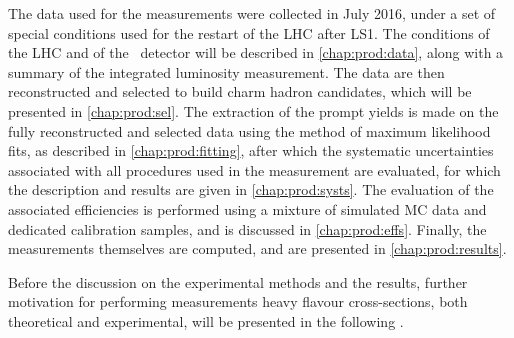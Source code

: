 The data used for the measurements were collected in July 2016, under a set of 
special conditions used for the restart of the \ac{LHC} after \ac{LS1}.
The conditions of the \ac{LHC} and of the \lhcb\ detector will be described in 
\cref{chap:prod:data}, along with a summary of the integrated luminosity 
measurement.
The data are then reconstructed and selected to build charm hadron candidates, 
which will be presented in \cref{chap:prod:sel}.
The extraction of the prompt yields is made on the fully reconstructed and 
selected data using the method of maximum likelihood fits, as described in 
\cref{chap:prod:fitting}, after which the systematic uncertainties associated 
with all procedures used in the measurement are evaluated, for which the 
description and results are given in \cref{chap:prod:systs}.
The evaluation of the associated efficiencies is performed using a mixture of 
simulated \acl{MC} data and dedicated calibration samples, and is discussed in 
\cref{chap:prod:effs}.
Finally, the measurements themselves are computed, and are presented in 
\cref{chap:prod:results}.

Before the discussion on the experimental methods and the results, further 
motivation for performing measurements heavy flavour cross-sections, both 
theoretical and experimental, will be presented in the following 
.
